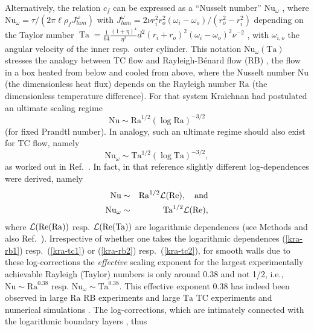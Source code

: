 \documentclass[aps,prl,superscriptaddress,preprint]{revtex4}
\def\be{\begin{equation}}
\def\ee{\end{equation}}
\newcommand{\Ta}{\operatorname{Ta}}
\begin{document}
Alternatively, the relation $c_f$ can be expressed as a ``Nusselt number'' $\mathrm{Nu}_\omega$ \cite{eck07b}, where 
$\mathrm{Nu}_\omega =  \tau / (2\pi \ell \rho_f  J_{lam}^\omega )$ with 
$J^\omega_{lam} = 2\nu r_i^2 r_o^2
(\omega_i - \omega_o)/ (r_o^2 - r_i^2)$ 
depending on 
the Taylor number 
$\Ta= \frac{1}{64}\frac{(1+\eta)^4}{\eta^2} d^2 (r_i+r_o )^2(\omega_i - \omega_o)^2\nu^{-2}$ \cite{gro16}, 
with $\omega_{i,o}$ the angular velocity of the inner resp.\ outer cylinder. 
This notation $\mathrm{Nu}_\omega (\mathrm{Ta})$ stresses the analogy between TC flow and Rayleigh-B\'enard flow (RB) \cite{ahl09,loh10},
the flow in a box heated from below and cooled from above, 
where the Nusselt number $\mathrm{Nu}$ (the dimensionless heat flux) depends  on the Rayleigh number $\textrm{Ra}$ (the dimensionless
temperature difference). For that system Kraichnan \cite{kra62} had postulated an ultimate scaling regime 
\be
\mathrm{Nu} \sim \mathrm{Ra}^{1/2} (\log \mathrm{Ra} )^{-3/2} 
\label{kra-rb1}
\ee
(for fixed Prandtl number). 
 In analogy, such an ultimate regime should also exist for TC flow,
 namely 
 \be
\mathrm{Nu}_\omega \sim \mathrm{Ta}^{1/2} (\log \mathrm{Ta} )^{-3/2}, 
\label{kra-tc1}
\ee
 as worked out in Ref.\ 
 \cite{gro11}. 
 In fact, in that  reference slightly different log-dependences were derived, namely 
 \begin{eqnarray} \label{kra-rb2}
 \mathrm{Nu} & \sim &  \mathrm{Ra}^{1/2} {\cal{L}}(\mathrm{Re}),  \quad \hbox{and}\\
 \mathrm{Nu}_\omega & \sim &  \mathrm{Ta}^{1/2} {\cal{L}}(\mathrm{Re}),
 \label{kra-tc2} 
 \end{eqnarray}
 where ${\cal{L}} (\mathrm{Re} (\mathrm{Ra}))$ resp.
 ${\cal{L}} (\mathrm{Re} (\mathrm{Ta}))$ 
 are logarithmic dependences (see Methods and also Ref.\  \cite{gro11}).  
 Irrespective of whether one takes the logarithmic dependences 
 (\ref{kra-rb1}) resp.\ 
 (\ref{kra-tc1}) or 
   (\ref{kra-rb2}) resp.\ 
 (\ref{kra-tc2}), for smooth walls 
 due to these log-corrections 
 the {\it effective} scaling exponent for the largest experimentally achievable 
 Rayleigh (Taylor) numbers is only around 0.38 and not 1/2, i.e., $\mathrm{Nu}\sim \mathrm{Ra}^{0.38}$ resp. $\mathrm{Nu}_\omega\sim \mathrm{Ta}^{0.38}$. 
 This effective exponent 0.38 has indeed been observed in large $\mathrm{Ra}$ RB experiments \cite{he12,he12a} 
and large $\mathrm{Ta}$ TC experiments \cite{hui12,gro16} and numerical simulations \cite{ost14pd,gro16}. 
The log-corrections, which are intimately connected with the logarithmic boundary layers \cite{ost16jfm}, thus
\end{document}
